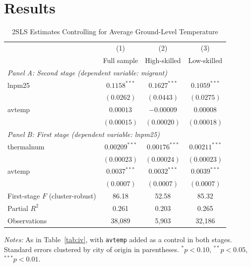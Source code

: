 \documentclass[11pt,twocolumn]{article}
\begin{document}
\section{Results}
\begin{table}[!t]
\centering
\begin{threeparttable}
\caption{2SLS Estimates Controlling for Average Ground-Level Temperature}
\label{tab:iv_temp}
\small
\begin{tabular}{lccc}
\toprule
 & (1) & (2) & (3) \\
 & Full sample & High-skilled & Low-skilled \\
\midrule
\multicolumn{4}{l}{\textit{Panel A: Second stage (dependent variable: migrant)}} \\
lnpm25 & $0.1158^{***}$ & $0.1627^{***}$ & $0.1059^{***}$ \\
 & $(0.0262)$ & $(0.0443)$ & $(0.0275)$ \\
avtemp & $0.00013$ & $-0.00009$ & $0.00008$ \\
 & $(0.00015)$ & $(0.00020)$ & $(0.00018)$ \\
\midrule
\multicolumn{4}{l}{\textit{Panel B: First stage (dependent variable: lnpm25)}} \\
thermalnum & $0.00209^{***}$ & $0.00176^{***}$ & $0.00211^{***}$ \\
 & $(0.00023)$ & $(0.00024)$ & $(0.00023)$ \\
avtemp & $0.0037^{***}$ & $0.0032^{***}$ & $0.0039^{***}$ \\
 & $(0.0007)$ & $(0.0007)$ & $(0.0007)$ \\
First-stage $F$ (cluster-robust) & 86.18 & 52.58 & 85.32 \\
Partial $R^2$ & 0.261 & 0.203 & 0.265 \\
\midrule
Observations & 38,089 & 5,903 & 32,186 \\
\bottomrule
\end{tabular}
\begin{tablenotes}\footnotesize
\item \textit{Notes:} As in Table~\ref{tab:iv}, with \texttt{avtemp} added as a control in both stages. Standard errors clustered by city of origin in parentheses. $^{*}p<0.10$, $^{**}p<0.05$, $^{***}p<0.01$.
\end{tablenotes}
\end{threeparttable}
\end{table}
\end{document}

